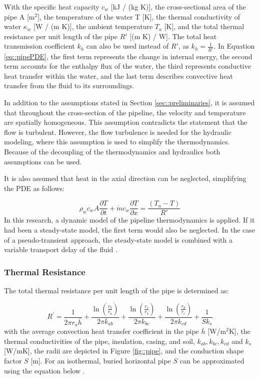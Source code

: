 With the specific heat capacity $c_w$ [kJ / (kg K)], the cross-sectional area of the pipe A [m$^2$], the temperature of the water T [K], the thermal conductivity of water $\kappa_w$ [W / (m K)], the ambient temperature $T_a$ [K], and the total thermal resistance per unit length of the pipe $R'$ [(m K) / W]. The total heat transmission coefficient $k_h$ can also be used instead of $R'$, as $k_h = \frac{1}{R'}$. 
In Equation \ref{eq::pipePDE}, the first term represents the change in internal energy, the second term accounts for the enthalpy flux of the water, the third represents conductive heat transfer within the water, and the last term describes convective heat transfer from the fluid to its surroundings.

In addition to the assumptions stated in Section \ref{sec::preliminaries}, it is assumed that throughout the cross-section of the pipeline, the velocity and temperature are spatially homogeneous. This assumption contradicts the statement that the flow is turbulent. However, the flow turbulence is needed for the hydraulic modeling, where this assumption is used to simplify the thermodynamics. Because of the decoupling of the thermodynamics and hydraulics both assumptions can be used. 

It is also assumed that heat in the axial direction can be neglected, simplifying the PDE as follows:

\begin{equation}\label{eq::simpipePDE}
\rho_w c_w A \frac{\partial T}{\partial t} + \dot{m} c_w \frac{\partial T}{\partial x}=\frac{\left(T_a-T\right)}{R'}
\end{equation}
In this research, a dynamic model of the pipeline thermodynamics is applied. If it had been a steady-state model, the first term would also be neglected. In the case of a pseudo-transient approach, the steady-state model is combined with a variable transport delay of the fluid \cite{PipePDE}.

\subsubsection{Thermal Resistance}
The total thermal resistance per unit length of the pipe is determined as: 

\begin{equation}
R^{\prime}=\frac{1}{2 \pi r_a \bar{h}}+\frac{\ln \left(\frac{r_b}{r_a}\right)}{2 \pi k_{a b}}+\frac{\ln \left(\frac{r_c}{r_b}\right)}{2 \pi k_{b c}}+\frac{\ln \left(\frac{r_d}{r_c}\right)}{2 \pi k_{c d}}+\frac{1}{S k_s}
\end{equation}
with the average convection heat transfer coefficient in the pipe $\bar{h}$ [W/m$^2$K], the thermal conductivities of the pipe, insulation, casing, and soil, $k_{ab}, k_{bc}, k_{cd}$ and $k_s$ [W/mK], the radii are depicted in Figure \ref{fig::pipe}, and the conduction shape factor $S$ [m]. For an isothermal, buried horizontal pipe $S$ can be approximated using the equation below \cite{PipePDE}. 

